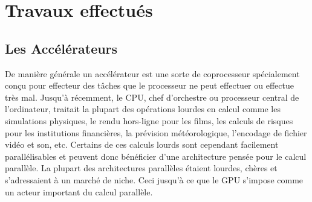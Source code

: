 \documentclass[11pt]{article}
\begin{document}
	\section{Travaux effectués}
		\subsection{Les Accélérateurs}
			De manière générale un accélérateur est une sorte de coprocesseur spécialement conçu pour effecteur des tâches que le processeur ne peut 
			effectuer ou effectue très mal. \newline
			Jusqu'à récemment, le CPU, chef d'orchestre ou processeur central de l'ordinateur, traitait la plupart des opérations lourdes en calcul 
			comme les simulations physiques, le rendu hors-ligne pour les films, les calculs de risques pour les institutions financières, la 
			prévision météorologique, l'encodage de fichier vidéo et son, etc. \newline
			Certains de ces calculs lourds sont cependant facilement parallélisables et peuvent donc bénéficier d'une architecture pensée pour le 
			calcul parallèle. La plupart des architectures parallèles étaient lourdes, chères et s'adressaient à un marché de niche. Ceci jusqu'à ce 
			que le GPU s'impose comme un acteur important du calcul parallèle. \newline
\end{document}
